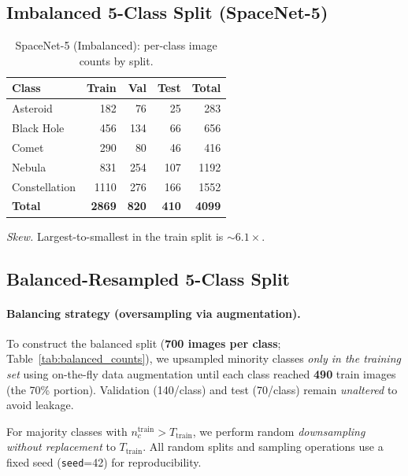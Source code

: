 \subsection{Imbalanced 5-Class Split (SpaceNet-5)}
\begin{table}[!t]
\centering
\caption{SpaceNet-5 (Imbalanced): per-class image counts by split.}
\begin{tabular}{lrrrr}
\toprule
\textbf{Class} & \textbf{Train} & \textbf{Val} & \textbf{Test} & \textbf{Total} \\
\midrule
Asteroid      & 182  & 76  & 25  & 283  \\
Black Hole    & 456  & 134 & 66  & 656  \\
Comet         & 290  & 80  & 46  & 416  \\
Nebula        & 831  & 254 & 107 & 1192 \\
Constellation & 1110 & 276 & 166 & 1552 \\
\midrule
\textbf{Total} & \textbf{2869} & \textbf{820} & \textbf{410} & \textbf{4099} \\
\bottomrule
\end{tabular}
\label{tab:spacenet_counts_imbal}
\end{table} 
\noindent\textit{Skew.} Largest-to-smallest in the train split is $\sim 6.1\times$.

\subsection{Balanced-Resampled 5-Class Split}

\paragraph{Balancing strategy (oversampling via augmentation).}
To construct the balanced split (\textbf{700 images per class}; Table~\ref{tab:balanced_counts}), we upsampled minority classes \emph{only in the training set} using on-the-fly data augmentation until each class reached \textbf{490} train images (the 70\% portion). Validation (140/class) and test (70/class) remain \emph{unaltered} to avoid leakage.

\noindent For majority classes with $n_c^{\text{train}} > T_{\text{train}}$, we perform random \emph{downsampling without replacement} to $T_{\text{train}}$. All random splits and sampling operations use a fixed seed (\texttt{seed}=42) for reproducibility.


